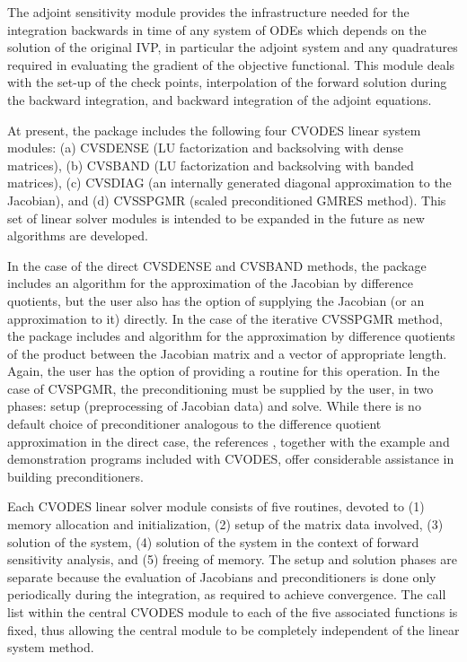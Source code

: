 The adjoint sensitivity module provides the infrastructure needed for the 
integration backwards in time of any system of ODEs which depends on the solution 
of the original IVP, in particular the adjoint system and any quadratures required
in evaluating the gradient of the objective functional.
This module deals with the set-up of the check points, interpolation of the forward 
solution during the backward integration, and backward integration of the adjoint
equations. 

At present, the package includes the following four CVODES linear system
modules:
(a) CVSDENSE (LU factorization and backsolving with dense matrices),
(b) CVSBAND (LU factorization and backsolving with banded matrices),
(c) CVSDIAG (an internally generated diagonal approximation to the 
Jacobian), and
(d) CVSSPGMR (scaled preconditioned GMRES method).
This set of linear solver modules is intended to be expanded in the
future as new algorithms are developed.

In the case of the direct CVSDENSE and CVSBAND methods, the package includes
an algorithm for the approximation of the Jacobian by difference
quotients, but the user also has the option of supplying the Jacobian
(or an approximation to it) directly. In the case of the iterative
CVSSPGMR method, the package includes and algorithm for the approximation
by difference quotients of the product between the Jacobian matrix and
a vector of appropriate length. Again, the user has the option of providing
a routine for this operation.
In the case of CVSPGMR, the preconditioning must be supplied by the user, 
in two phases: setup (preprocessing of Jacobian data) and solve.
While there is no default choice of preconditioner analogous to the 
difference quotient approximation in the direct case, the references
\cite{BrHi:89,Byr:92}, together with
the example and demonstration programs included with CVODES, offer
considerable assistance in building preconditioners.

Each CVODES linear solver module consists of five routines, devoted to (1)
memory allocation and initialization, (2) setup of the matrix data
involved, (3) solution of the system, (4) solution of the system in the
context of forward sensitivity analysis, and (5) freeing of memory.  The
setup and solution phases are separate because the evaluation of
Jacobians and preconditioners is done only periodically during the
integration, as required to achieve convergence. The call list within
the central CVODES module to each of the five associated functions is
fixed, thus allowing the central module to be completely independent
of the linear system method.

